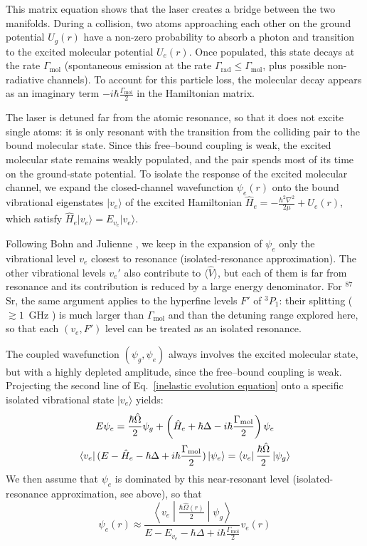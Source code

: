 This matrix equation shows that the laser creates a bridge between the two manifolds. During a collision, two atoms approaching each other on the ground potential $U_g(r)$ have a non-zero probability to absorb a 
photon and transition to the excited molecular potential $U_e(r)$. Once populated, this state decays at the rate $\Gamma_{\text{mol}}$ (spontaneous emission at the rate $\Gamma_{\text{rad}}\leq\Gamma_{\text{mol}}$, plus possible non-radiative channels). To account for this particle loss, the molecular decay appears as an imaginary term $-i\hbar\frac{\Gamma_{\text{mol}}}{2}$ in the Hamiltonian matrix.

The laser is detuned far from the atomic resonance, so that it does not excite single atoms: it is only resonant with the transition from the colliding pair to the bound molecular state. Since this free--bound coupling is weak, the excited molecular state remains weakly populated, and the pair spends most of its time on the ground-state potential.
To isolate the response of the excited molecular channel, we expand the closed-channel wavefunction $\psi_e(r)$ onto the bound vibrational eigenstates $\vert{}v_e\rangle$ of the excited Hamiltonian 
$\hat{H}_e = -\frac{\hbar^2\nabla^2}{2\mu} + U_e(r)$, which satisfy $\hat{H}_e \vert{}v_e\rangle = E_{v_e} \vert{}v_e\rangle$.

Following Bohn and Julienne \cite{bohn1997_prospects}, we keep in the expansion of
$\psi_e$ only the vibrational level $v_e$ closest to resonance (isolated-resonance
approximation). The other vibrational levels $v_e'$ also contribute to
$\langle\hat V\rangle$, but each of them is far from resonance and its contribution is
reduced by a large energy denominator. For $^{87}$Sr, the same argument applies to the
hyperfine levels $F'$ of $^3P_1$: their splitting ($\gtrsim1$~GHz
\cite{stellmerThesis}) is much larger than $\Gamma_{\text{mol}}$ and than the detuning
range explored here, so that each $(v_e,F')$ level can be treated as an isolated
resonance.

The coupled wavefunction $(\psi_g,\psi_e)$ always involves the excited molecular
state, but with a highly depleted amplitude, since the free--bound coupling is
weak. Projecting the second line of Eq.~\ref{inelastic evolution equation} onto
a specific isolated vibrational state $\vert{}v_e\rangle$ yields:
\begin{gather}
E \psi_e = \frac{\hbar \hat{\Omega}}{2}\psi_g + \left(\hat{H}_e + \hbar \Delta - i\hbar \frac{\Gamma_{\text{mol}}}{2} \right)\psi_e\\
\bra{v_e}(E-\hat{H}_e - \hbar \Delta + i\hbar \frac{\Gamma_{\text{mol}}}{2})\ket{\psi_e} = \bra{v_e}\frac{\hbar\hat{\Omega}}{2}\ket{\psi_g}
\end{gather}
We then assume that $\psi_e$ is dominated by this near-resonant level
(isolated-resonance approximation, see above), so that
\begin{equation}
\psi_e(r) \approx \frac{\left\langle v_e \middle| \frac{\hbar\hat{\Omega}(r)}{2} \middle| \psi_g \right\rangle}{E - E_{v_e} - \hbar\Delta + i\hbar\frac{\Gamma_{\text{mol}}}{2}} v_e(r)
\end{equation}


